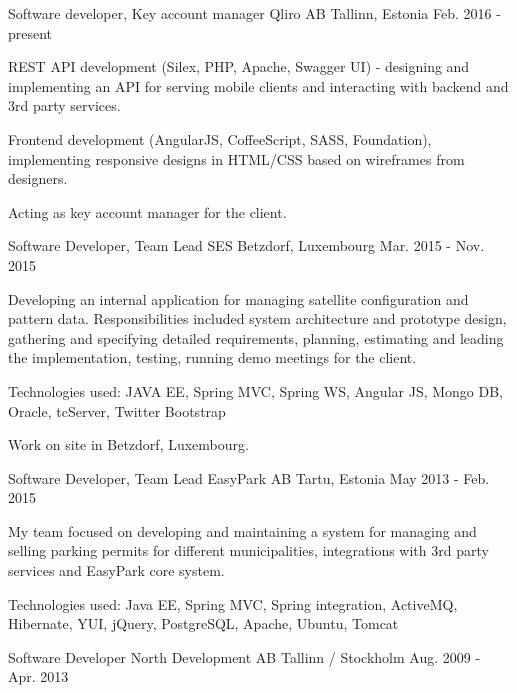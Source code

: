 \begin{cventries}
  \cventry
    {Software developer, Key account manager}
    {Qliro AB}
    {Tallinn, Estonia}
    {Feb. 2016 - present}
    {
      \begin{cvitems}
        \item { REST API development (Silex, PHP, Apache, Swagger UI) - designing and implementing an API for serving mobile clients and interacting with backend and 3rd party services.}
        \item { Frontend development (AngularJS, CoffeeScript, SASS, Foundation), implementing responsive designs in HTML/CSS based on wireframes from designers.}
        \item { Acting as key account manager for the client.}  
      \end{cvitems}
    }
  \cventry
    {Software Developer, Team Lead}
    {SES}
    {Betzdorf, Luxembourg}
    {Mar. 2015 - Nov. 2015}
    {
      \begin{cvitems}
        \item {Developing an internal application for managing satellite configuration and pattern data. Responsibilities included system architecture and prototype design, gathering and specifying detailed requirements, planning, estimating and leading the implementation, testing, running demo meetings for the client.}
        \item { Technologies used: JAVA EE, Spring MVC, Spring WS, Angular JS, Mongo DB, Oracle, tcServer, Twitter Bootstrap }  
        \item { Work on site in Betzdorf, Luxembourg. }  
      \end{cvitems}
    }
  \cventry
    {Software Developer, Team Lead}
    {EasyPark AB}
    {Tartu, Estonia}
    {May 2013 - Feb. 2015}
    {
      \begin{cvitems}
        \item {My team focused on developing and maintaining a system for managing and selling parking permits for different municipalities, integrations with 3rd party services and EasyPark core system.}
        \item { Technologies used: Java EE, Spring MVC, Spring integration, ActiveMQ, Hibernate, YUI, jQuery, PostgreSQL, Apache, Ubuntu, Tomcat }  
      \end{cvitems}
    }
  \cventry
    {Software Developer}
    {North Development AB}
    {Tallinn / Stockholm}
    {Aug. 2009 - Apr. 2013}
    {
      \begin{cvitems}

\end{cvitems}}
\end{cventries}
